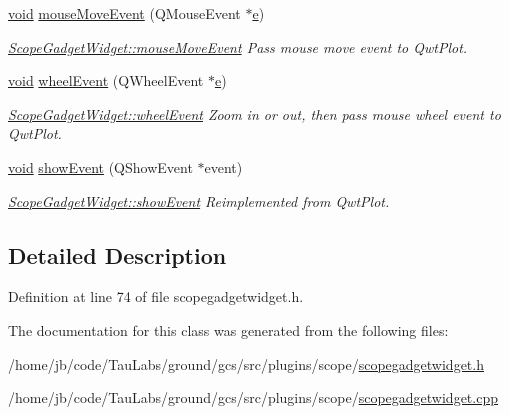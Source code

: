 \begin{DoxyCompactItemize}
\hyperlink{group___u_a_v_objects_plugin_ga444cf2ff3f0ecbe028adce838d373f5c}{void} \hyperlink{group___scope_plugin_ga3a4b3097cd04ab00ad3bbdd290186696}{mouse\-Move\-Event} (\-Q\-Mouse\-Event $\ast$\hyperlink{_o_p_plots_8m_a9425be9aab51621e317ba7ade564b570}{e})
\begin{DoxyCompactList}\small\item\em \hyperlink{group___scope_plugin_ga3a4b3097cd04ab00ad3bbdd290186696}{\-Scope\-Gadget\-Widget\-::mouse\-Move\-Event} \-Pass mouse move event to \-Qwt\-Plot. \end{DoxyCompactList}\item 
\hyperlink{group___u_a_v_objects_plugin_ga444cf2ff3f0ecbe028adce838d373f5c}{void} \hyperlink{group___scope_plugin_ga1cf4485edf803c91fec9d29e6f33dfd8}{wheel\-Event} (\-Q\-Wheel\-Event $\ast$\hyperlink{_o_p_plots_8m_a9425be9aab51621e317ba7ade564b570}{e})
\begin{DoxyCompactList}\small\item\em \hyperlink{group___scope_plugin_ga1cf4485edf803c91fec9d29e6f33dfd8}{\-Scope\-Gadget\-Widget\-::wheel\-Event} \-Zoom in or out, then pass mouse wheel event to \-Qwt\-Plot. \end{DoxyCompactList}\item 
\hyperlink{group___u_a_v_objects_plugin_ga444cf2ff3f0ecbe028adce838d373f5c}{void} \hyperlink{group___scope_plugin_ga323510a973ec27e6c976ec2748cfcaa6}{show\-Event} (\-Q\-Show\-Event $\ast$event)
\begin{DoxyCompactList}\small\item\em \hyperlink{group___scope_plugin_ga323510a973ec27e6c976ec2748cfcaa6}{\-Scope\-Gadget\-Widget\-::show\-Event} \-Reimplemented from \-Qwt\-Plot. \end{DoxyCompactList}\end{DoxyCompactItemize}


\subsection{\-Detailed \-Description}


\-Definition at line 74 of file scopegadgetwidget.\-h.



\-The documentation for this class was generated from the following files\-:\begin{DoxyCompactItemize}
\item 
/home/jb/code/\-Tau\-Labs/ground/gcs/src/plugins/scope/\hyperlink{scopegadgetwidget_8h}{scopegadgetwidget.\-h}\item 
/home/jb/code/\-Tau\-Labs/ground/gcs/src/plugins/scope/\hyperlink{scopegadgetwidget_8cpp}{scopegadgetwidget.\-cpp}\end{DoxyCompactItemize}
